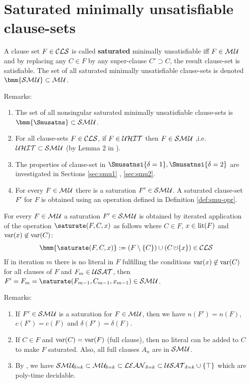 \documentclass{report}
\begin{document}
\section{Saturated minimally unsatisfiable clause-sets}
\label{sec:smu}

\begin{defi}\label{def:smu}
A clause set $F \in \mathcal{CLS}$ is called \textbf{saturated} minimally unsatisfiable iff $F \in \mathcal{M\hspace{0.8pt}U} $ and by replacing any $C \in F$ by any super-clause $C' \supset C$, the result clause-set is satisfiable. The set of all saturated minimally unsatisfiable clause-sets is denoted $\bmm{\Smusat} \subset \Musat$.
\end{defi}
Remarks:
  \begin{enumerate}
  \item The set of all nonsingular saturated minimally unsatisfiable clause-sets is $\bmm{\Smusatns} \subset \Smusat$.
  \item For all clause-sets $F \in \mathcal{CLS}$, if $F \in \mathcal{U}\mathcal{HIT}$ then $ F \in \mathcal{S}\mathcal{M\hspace{0.8pt}U}$ ,i.e. $\mathcal{U}\mathcal{HIT} \subset \mathcal{S}\mathcal{M\hspace{0.8pt}U}$ (by Lemma 2 in \cite{KullmannZhao2012ConfluenceJ}). 
  \item The properties of clause-set in $\Smusatnsi{\delta=1}, \Smusatnsi{\delta=2}$ are investigated in Sections \ref{sec:smu1} , \ref{sec:smu2}.
  \item For every $F \in \mathcal{M\hspace{0.8pt}U}$ there is a saturation $F' \in \mathcal{S}\mathcal{M\hspace{0.8pt}U}$. A saturated clause-set  $F'$ for $F$ is obtained using an operation defined in Definition \ref{def:smu-opr}.
  \end{enumerate}

\begin{defi}\label{def:smu-opr}
\cite{KullmannZhao2012ConfluenceJ} For every $F \in \mathcal{M\hspace{0.8pt}U}$ a saturation $F' \in \mathcal{S}\mathcal{M\hspace{0.8pt}U}$ is obtained by iterated application of the operation $\saturate(F,C,x)$ as follows where $C \in F$, $x \in \operatorname{lit}(F)$ and $\operatorname{var}(x) \not \in \operatorname{var}(C)$:
  \begin{displaymath}
    \bmm{\saturate(F,C,x)} := (F \sm \set{C}) \cup (C \addcup \set{x}) \in \Cls
  \end{displaymath}
If in iteration $m$ there is no literal in $F$ fulfilling the conditions $\operatorname{var}(x) \not \in \operatorname{var}(C)$ for all clauses of $F$ and $F_m \in \mathcal{USAT}$, then $F' =F_m=\saturate(F_{m-1},C_{m-1},x_{m-1}) \in \Smusat$. 
\end{defi}
Remarks:
  \begin{enumerate}
  \item If $F' \in \mathcal{S}\mathcal{M\hspace{0.8pt}U}$ is a saturation for $F \in \mathcal{M\hspace{0.8pt}U}$, then we have $n(F')=n(F)$, $c(F')=c(F)$ and $\delta(F')=\delta(F)$.
  \item If $C \in F$ and $\operatorname{var}(C) = \operatorname{var}(F)$ (full clause), then no literal can be added to $C$ to make $F$ saturated. Also, all full clauses $A_n$ are in $\mathcal{S}\mathcal{M\hspace{0.8pt}U}$.
  \item By \cite{Ku99dK}, we have $ \mathcal{S}\mathcal{M\hspace{0.8pt}U}_{\!\delta=k} \subset \mathcal{M\hspace{0.8pt}U}_{\!\delta=k} \subset \mathcal{LEAN}_{\delta=k} \subset \mathcal{USAT}_{\delta=k} \cup \{ \top \} $ which are poly-time decidable.
  \end{enumerate} 
  
\end{document}
